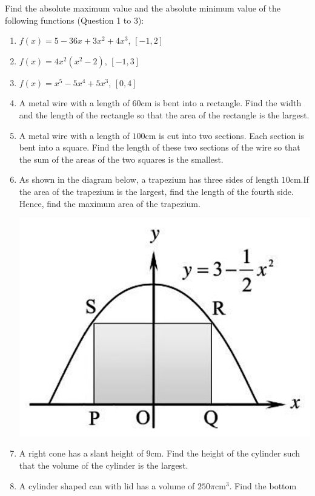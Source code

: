 \documentclass{report}
\begin{document}
Find the absolute maximum value and the absolute minimum value of the following
functions (Question 1 to 3):
\begin{enumerate}
    \item $f(x)=5-36 x+3 x^2+4 x^3$, $[-1,2]$
    \item $f(x)=4 x^2\left(x^2-2\right)$, $[-1,3]$
    \item $f(x)=x^5-5 x^4+5 x^3$, $[0,4]$
    \item A metal wire with a length of $60$cm is bent into a rectangle. Find the width
          and the length of the rectangle so that the area of the rectangle is the
          largest.
    \item A metal wire with a length of $100$cm is cut into two sections. Each section is
          bent into a square. Find the length of these two sections of the wire so that
          the sum of the areas of the two squares is the smallest.
    \item As shown in the diagram below, a trapezium has three sides of length $10$cm.If
          the area of the trapezium is the largest, find the length of the fourth side.
          Hence, find the maximum area of the trapezium.
          \begin{center}
              \includegraphics[scale=0.25]{assets/26-9.png}
          \end{center}
    \item A right cone has a slant height of $9$cm. Find the height of the cylinder such
          that the volume of the cylinder is the largest.
    \item A cylinder shaped can with lid has a volume of $250\pi$cm$^3$. Find the bottom

\end{enumerate}
\end{document}
